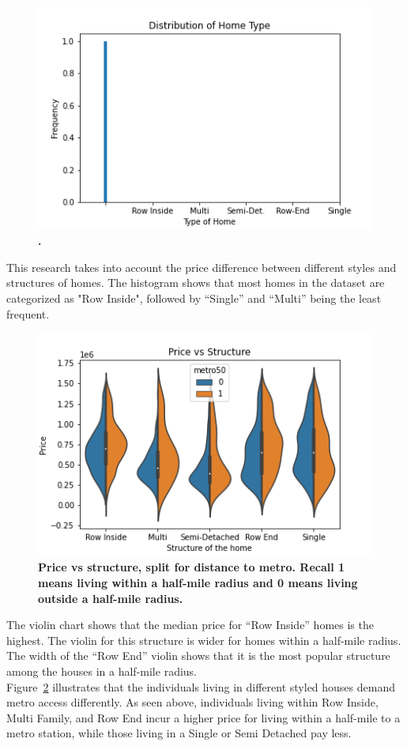 \documentclass[12pt]{report}
\newcommand\tab[1][.60cm]{\hspace*{#1}}
\begin{document}
\begin{figure}[h]
\begin{center}
\includegraphics[width=130mm]{structureHist.png}
\end{center}
\caption{\textbf{.}}
\label{fig:strHist}
\end{figure}
This research takes into account the price difference between different styles and structures of homes. The histogram shows that most homes in the dataset are categorized as "Row Inside", followed by “Single” and “Multi” being the least frequent. 
\clearpage
\begin{figure}[h]
\begin{center}
\caption{\textbf{Price vs structure, split for distance to metro. Recall 1 means living within a half-mile radius and 0 means living outside a half-mile radius. }}
\includegraphics[width=130mm]{structureViolin.png}
\end{center}
\label{fig:strHist}
\end{figure}
The violin chart shows that the median price for “Row Inside” homes is the highest. The violin for this structure is wider for homes within a half-mile radius. The width of the “Row End” violin shows that it is the most popular structure among the houses in a half-mile radius.\\
\tab Figure~\ref{fig:strHist} illustrates that the individuals living in different styled houses demand metro access differently. As seen above, individuals living within Row Inside, Multi Family, and Row End incur a higher price for living within a half-mile to a metro station, while those living in a Single or Semi Detached pay less.
\end{document}
